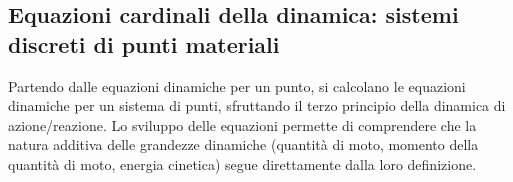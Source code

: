 \documentclass[letterpaper,10pt,english]{jupyterBook}
\begin{document}
\subsection{Equazioni cardinali della dinamica: sistemi discreti di punti materiali}
\label{\detokenize{ch/dynamics-eom-points:equazioni-cardinali-della-dinamica-sistemi-discreti-di-punti-materiali}}\label{\detokenize{ch/dynamics-eom-points:classical-mechanics-dynamics-eom-points}}\label{\detokenize{ch/dynamics-eom-points::doc}}
\sphinxAtStartPar
Partendo dalle equazioni dinamiche per un punto, si calcolano le equazioni dinamiche per un sistema di punti, sfruttando il terzo principio della dinamica di azione/reazione. Lo sviluppo delle equazioni permette di comprendere che la natura additiva delle grandezze dinamiche (quantità di moto, momento della quantità di moto, energia cinetica) segue direttamente dalla loro definizione.
\end{document}

